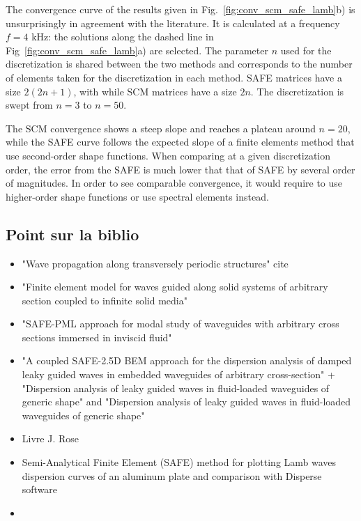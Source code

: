 The convergence curve of the results given in Fig.~\ref{fig:conv_scm_safe_lamb}b) is unsurprisingly in agreement with the literature. It is calculated at a frequency $f=4$ kHz: the solutions along the dashed line in Fig~\ref{fig:conv_scm_safe_lamb}a) are selected. The parameter $n$ used for the discretization is shared between the two methods and corresponds to the number of elements taken for the discretization in each method. SAFE matrices have a size $2(2n+ 1)$, with while SCM matrices have a size $2n$. The discretization is swept from $n=3$ to $n=50$.

The SCM convergence shows a steep slope and reaches a plateau around $n = 20$, while the SAFE curve follows the expected slope of a finite elements method that use second-order shape functions. When comparing at a given discretization order, the error from the SAFE is much lower that that of SAFE by several order of magnitudes. In order to see comparable convergence, it would require to use higher-order shape functions or use spectral elements instead.


\subsection{Point sur la biblio}
\begin{itemize}
    \item "Wave propagation along transversely periodic structures" cite \cite{predoi2007} 
    \item "Finite element model for waves guided along solid systems of arbitrary section coupled to infinite solid media" \cite{castaings2008} 
    \item "SAFE-PML approach for modal study of waveguides with arbitrary cross sections immersed in inviscid fluid" \cite{zuo2017} 
    \item "A coupled SAFE-2.5D BEM approach for the dispersion analysis of damped leaky guided waves in embedded waveguides of arbitrary cross-section" \cite{mazzotti2013} + "Dispersion analysis of leaky guided waves in fluid-loaded waveguides of generic shape" and \cite{mazzotti2014} "Dispersion analysis of leaky guided waves in fluid-loaded waveguides of generic shape"
    \item Livre J. Rose \cite{rose2014}
    \item Semi-Analytical Finite Element (SAFE) method for plotting Lamb waves dispersion curves of an aluminum plate and comparison with Disperse software \cite{yacoubi2022}
    \item \cite{hayashi2014}
\end{itemize}